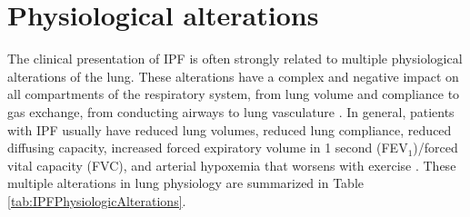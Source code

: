 \section{Physiological alterations}
The clinical presentation of IPF is often strongly related to multiple physiological alterations of the lung. These alterations have a complex and negative impact on all compartments of the respiratory system, from lung volume and compliance to gas exchange, from conducting airways to lung vasculature \citep{plantier2018physiology}. In general, patients with IPF usually have reduced lung volumes, reduced lung compliance, reduced diffusing capacity, increased forced expiratory volume in 1 second (FE$\mathrm{V_1}$)/forced vital capacity (FVC), and arterial hypoxemia that worsens with exercise \citep{crystal1976idiopathic,american2000idiopathic,cortes2014idiopathic,plantier2018physiology}. These multiple alterations in lung physiology are summarized in Table \ref{tab:IPFPhysiologicAlterations}.

